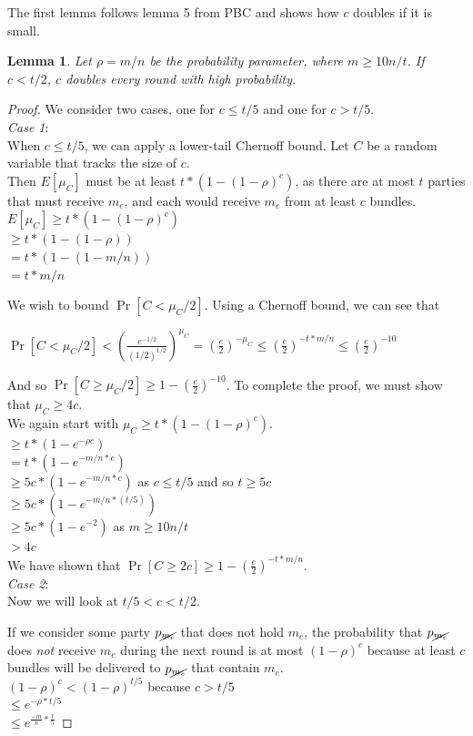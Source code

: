 \documentclass{article}
\newtheorem{lemma}{Lemma}
\begin{document}
The first lemma follows lemma 5 from PBC and shows how $c$ doubles if it is small.
\begin{lemma}
Let $\rho = m / n$ be the probability parameter, where $m \geq 10n/t$. If $c < t / 2$, $c$ doubles every round with high probability.
\end{lemma}
\begin{proof}
We consider two cases, one for $c \leq t/5$ and one for $c > t/5$.\\
\emph{Case 1}: \\
When $c \leq t/5$, we can apply a lower-tail Chernoff bound. Let $C$ be a random variable that tracks the size of $c$.\\
Then $E[\mu_C]$ must be at least $t * (1 - (1 - \rho)^{c})$, as there are at most $t$ parties that must receive $m_e$, and each would receive $m_e$ from at least $c$ bundles.\\
$E[\mu_C] \geq t * (1 - (1 - \rho)^{c})$\\
$\geq t * (1 - (1 - \rho))$\\
$=t * (1 - (1 - m/n))$\\
$=t * m/n$

We wish to bound $\Pr[C < \mu_C/2]$. Using a Chernoff bound, we can see that 
\begin{center}
$\Pr[C < \mu_C/2] < (\frac{e^{-1/2}}{(1/2)^{1/2}})^{\mu_C} = (\frac{e}{2})^{-\mu_C} \leq (\frac{e}{2})^{-t*m/n} \leq (\frac{e}{2})^{-10}$
\end{center}

And so $\Pr[C \geq \mu_C/2] \geq 1 - (\frac{e}{2})^{-10}$. To complete the proof, we must show that $\mu_C \geq 4c$.\\
We again start with $\mu_C \geq t * (1 - (1 - \rho)^{c})$.\\
$\geq t * (1 - e^{-\rho c})$\\
$= t * (1 - e^{-m/n *c})$\\
$\geq 5c * (1 - e^{-m/n*c})$ as $c \leq t/5$ and so $t \geq 5c$\\
$\geq 5c * (1 - e^{-m/n * (t/5)})$\\
$\geq 5c * (1 - e^{-2})$ as $m \geq 10n/t$\\
$> 4c$\\
We have shown that $\Pr[C \geq 2c] \geq 1 - (\frac{e}{2})^{-t*m/n} $.\\
\emph{Case 2}: \\
Now we will look at $t/5 < c < t/2$.

If we consider some party $p_{\cancel{m_e}}$ that does not hold $m_e$, the probability that $p_{\cancel{m_e}}$ does \emph{not} receive $m_e$ during the next round is at most $(1 - \rho)^{c}$ because at least $c$ bundles will be delivered to $p_{\cancel{m_e}}$ that contain $m_e$.\\
$(1 - \rho)^{c} < (1 - \rho)^{t/5}$ because $c > t/5$\\
$\leq e^{-\rho*t/5}$\\
$\leq e^{\frac{-m}{n} * \frac{t}{5}}$


\end{proof}
\end{document}
